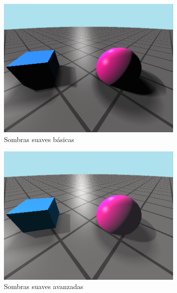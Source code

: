 \begin{figure}[ht!]
\begin{subfigure}[b]{0.3\textwidth}
        \centering
        \includegraphics[width=\textwidth]{Plantilla-TFG-master/img/escena5_sombraSuave1.png}
        \caption{Sombras suaves básicas}
    \end{subfigure}
    \hfill
    \begin{subfigure}[b]{0.3\textwidth}
        \centering
        \includegraphics[width=\textwidth]{Plantilla-TFG-master/img/escena6_sombraSuave2.png}
        \caption{Sombras suaves avanzadas}
    \end{subfigure}
    \medskip
    \begin{subfigure}[b]{0.45\textwidth}
        \centering

\end{subfigure}
\end{figure}
